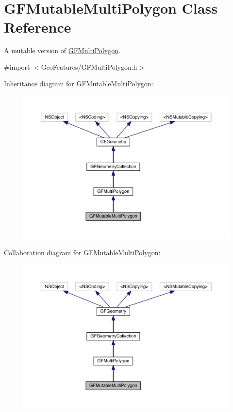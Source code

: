 \hypertarget{interface_g_f_mutable_multi_polygon}{}\section{G\+F\+Mutable\+Multi\+Polygon Class Reference}
\label{interface_g_f_mutable_multi_polygon}


A mutable version of \hyperlink{interface_g_f_multi_polygon}{G\+F\+Multi\+Polygon}.  




{\ttfamily \#import $<$Geo\+Features/\+G\+F\+Multi\+Polygon.\+h$>$}



Inheritance diagram for G\+F\+Mutable\+Multi\+Polygon\+:
\nopagebreak
\begin{figure}[H]
\begin{center}
\leavevmode
\includegraphics[width=350pt]{interface_g_f_mutable_multi_polygon__inherit__graph}
\end{center}
\end{figure}


Collaboration diagram for G\+F\+Mutable\+Multi\+Polygon\+:
\nopagebreak
\begin{figure}[H]
\begin{center}
\leavevmode
\includegraphics[width=350pt]{interface_g_f_mutable_multi_polygon__coll__graph}
\end{center}
\end{figure}
